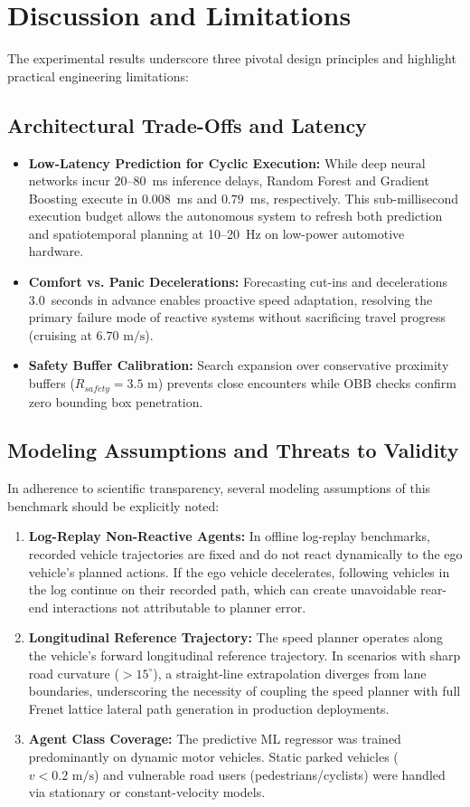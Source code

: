 \documentclass[runningheads]{llncs}
\begin{document}
%
%
%
\section{Discussion and Limitations}
\label{sec:discussion}
The experimental results underscore three pivotal design principles and highlight practical engineering limitations:

\subsection{Architectural Trade-Offs and Latency}
\begin{itemize}
    \item \textbf{Low-Latency Prediction for Cyclic Execution:} While deep neural networks incur 20--80~ms inference delays, Random Forest and Gradient Boosting execute in $0.008$~ms and $0.79$~ms, respectively. This sub-millisecond execution budget allows the autonomous system to refresh both prediction and spatiotemporal planning at 10--20~Hz on low-power automotive hardware.
    \item \textbf{Comfort vs. Panic Decelerations:} Forecasting cut-ins and decelerations 3.0~seconds in advance enables proactive speed adaptation, resolving the primary failure mode of reactive systems without sacrificing travel progress (cruising at $6.70\text{ m/s}$).
    \item \textbf{Safety Buffer Calibration:} Search expansion over conservative proximity buffers ($R_{safety} = 3.5\text{ m}$) prevents close encounters while OBB checks confirm zero bounding box penetration.
\end{itemize}

\subsection{Modeling Assumptions and Threats to Validity}
In adherence to scientific transparency, several modeling assumptions of this benchmark should be explicitly noted:
\begin{enumerate}
    \item \textbf{Log-Replay Non-Reactive Agents:} In offline log-replay benchmarks, recorded vehicle trajectories are fixed and do not react dynamically to the ego vehicle's planned actions. If the ego vehicle decelerates, following vehicles in the log continue on their recorded path, which can create unavoidable rear-end interactions not attributable to planner error.
    \item \textbf{Longitudinal Reference Trajectory:} The speed planner operates along the vehicle's forward longitudinal reference trajectory. In scenarios with sharp road curvature ($>15^\circ$), a straight-line extrapolation diverges from lane boundaries, underscoring the necessity of coupling the speed planner with full Frenet lattice lateral path generation in production deployments.
    \item \textbf{Agent Class Coverage:} The predictive ML regressor was trained predominantly on dynamic motor vehicles. Static parked vehicles ($v < 0.2\text{ m/s}$) and vulnerable road users (pedestrians/cyclists) were handled via stationary or constant-velocity models.
\end{enumerate}
\end{document}
